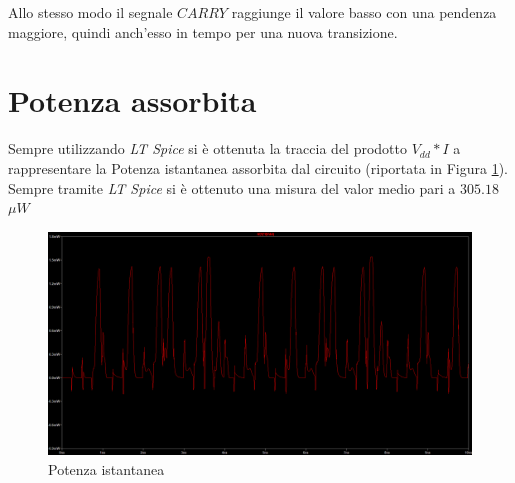 \documentclass[11pt]{article} %
\begin{document}
Allo stesso modo il segnale $CARRY$ raggiunge il valore basso con una pendenza maggiore, quindi anch'esso in tempo per una nuova transizione.
\clearpage

\section{Potenza assorbita}
Sempre utilizzando \emph{LT Spice} si è ottenuta la traccia del prodotto $V_{dd}*I$ a rappresentare la Potenza istantanea assorbita dal circuito (riportata in Figura \ref{fig:Power}).
\newline
Sempre tramite \emph{LT Spice} si è ottenuto una misura del valor medio pari a $305.18 $  $\mu W$

 \begin{figure}[h!]
  \includegraphics[width=\linewidth]{power.png}
  \caption{Potenza istantanea}
  \label{fig:Power}
\end{figure}
\end{document}
